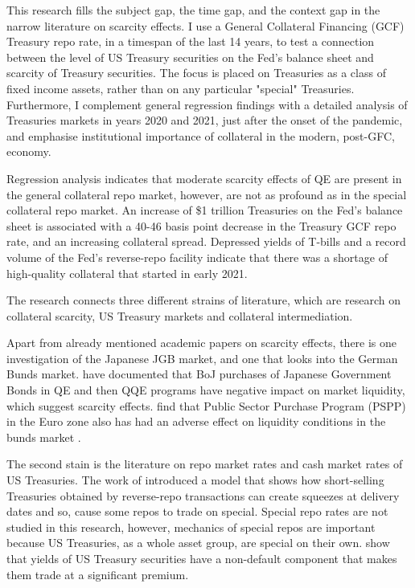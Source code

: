\documentclass[11pt,a4paper,english,oneside]{article}
\begin{document}
This research fills the subject gap, the time gap, and the context gap in the narrow literature on scarcity effects. I use a General Collateral Financing (GCF) Treasury repo rate, in a timespan of the last 14 years, to test a connection between the level of US Treasury securities on the Fed's balance sheet and scarcity of Treasury securities. The focus is placed on Treasuries as a class of fixed income assets, rather than on any particular "special" Treasuries. Furthermore, I complement general regression findings with a detailed analysis of Treasuries markets in years 2020 and 2021, just after the onset of the pandemic, and emphasise institutional importance of collateral in the modern, post-GFC, economy.

Regression analysis indicates that moderate scarcity effects of QE are present in the general collateral repo market, however, are not as profound as in the special collateral repo market. An increase of \$1 trillion Treasuries on the Fed's balance sheet is associated with a 40-46 basis point decrease in the Treasury GCF repo rate, and an increasing collateral spread. Depressed yields of T-bills and a record volume of the Fed's reverse-repo facility indicate that there was a shortage of high-quality collateral that started in early 2021.

The research connects three different strains of literature, which are research on collateral scarcity, US Treasury markets and collateral intermediation.

Apart from already mentioned academic papers on scarcity effects, there is one investigation of the Japanese JGB market, and one that looks into the German Bunds market. \citet{han2018} have documented that BoJ purchases of Japanese Government Bonds in QE and then QQE programs have negative impact on market liquidity, which suggest scarcity effects. \citet{schlepper2017} find that Public Sector Purchase Program (PSPP) in the Euro zone also has had an adverse effect on liquidity conditions in the bunds market .

The second stain is the literature on repo market rates and cash market rates of US Treasuries. The work of \citet{duffie1996} introduced a model that shows how short-selling Treasuries obtained by reverse-repo transactions can create squeezes at delivery dates and so, cause some repos to trade on special. Special repo rates are not studied in this research, however, mechanics of special repos are important because US Treasuries, as a whole asset group, are special on their own. \citet{krishnamurthy2012} show that yields of US Treasury securities have a non-default component that makes them trade at a significant premium. 
\end{document}
